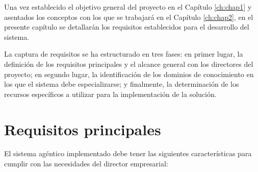 Una vez establecido el objetivo general del proyecto en el Capítulo \ref{ch:chap1} y asentados los conceptos con los que se trabajará en el Capítulo \ref{ch:chap2}, en el presente capítulo se detallarán los requisitos establecidos para el desarrollo del sistema.

La captura de requisitos se ha estructurado en tres fases: en primer lugar, la definición de los requisitos principales y el alcance general con los directores del proyecto; en segundo lugar, la identificación de los dominios de conocimiento en los que el sistema debe especializarse; y finalmente, la determinación de los recursos específicos a utilizar para la implementación de la solución.

\section{Requisitos principales}

El sistema agéntico implementado debe tener las siguientes características para cumplir con las necesidades del director empresarial: 

